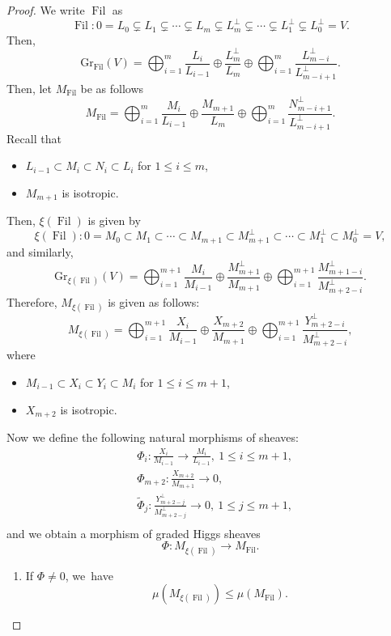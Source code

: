 \documentclass[11pt]{article}
\numberwithin{equation}{section}
\DeclareMathOperator{\Filt}{Fil}
\newcommand{\Gr}{\mathrm{Gr}}
\theoremstyle{plain}
\theoremstyle{definition}
\begin{document}
\begin{proof}
We write $\Filt$ as
\[
\Filt: 0= L_0 \subsetneq L_1 \subsetneq \cdots \subsetneq L_m \subsetneq L_m^\perp\subsetneq\cdots \subsetneq L_1^\perp\subsetneq L_0^\perp= V.
\]
Then,
\[
\Gr_{\Filt}(V)=\mathop{\bigoplus}_{i=1}^{m} \frac{L_i}{L_{i-1}}\oplus \frac{L_m^\perp}{L_m}\oplus \mathop{\bigoplus}_{i=1}^{m} \frac{L_{m-i}^\perp}{L_{m-i+1}^\perp}.
\]
Then, let $M_{\Filt}$ be as follows
\[
M_{\Filt}=\mathop{\bigoplus}_{i=1}^{m} \frac{M_i}{L_{i-1}}\oplus \frac{M_{m+1}}{L_m}\oplus \mathop{\bigoplus}_{i=1}^{m} \frac{N_{m-i+1}^\perp}{L_{m-i+1}^\perp}.
\]
Recall that
\begin{itemize}
\item $L_{i-1} \subset M_i \subset N_i \subset L_i$ for $1 \leq i \leq m$,
\item $M_{m+1}$ is isotropic.
\end{itemize}
Then, $\xi(\Filt)$ is given by
\[
\xi(\Filt):0=M_0\subset M_1\subset\cdots\subset M_{m+1}\subset M_{m+1}^\perp\subset\cdots\subset M_1^\perp\subset M_0^\perp=V,
\]
and similarly,
\[
\Gr_{\xi(\Filt)}(V)=\mathop{\bigoplus}_{i=1}^{m+1} \frac{M_i}{M_{i-1}}\oplus \frac{M_{m+1}^\perp}{M_{m+1}}\oplus \mathop{\bigoplus}_{i=1}^{m+1} \frac{M_{m+1-i}^\perp}{M_{m+2-i}^\perp}.
\]
Therefore, $M_{\xi(\Filt)}$ is given as follows:
\[
M_{\xi(\Filt)}=\mathop{\bigoplus}_{i=1}^{m+1} \frac{X_i}{M_{i-1}}\oplus \frac{X_{m+2}}{M_{m+1}}\oplus \mathop{\bigoplus}_{i=1}^{m+1} \frac{Y_{m+2-i}^\perp}{M_{m+2-i}^\perp},
\]
where
\begin{itemize}
\item $M_{i-1} \subset X_i \subset Y_i \subset M_i$ for $1 \leq i \leq m+1$,
\item $X_{m+2}$ is isotropic.
\end{itemize}

Now we define the following natural morphisms of sheaves:
\begin{equation}
\begin{split}
&\Phi_i:\frac{X_i}{M_{i-1}}\to \frac{M_i}{L_{i-1}},\ 1\leq i\leq m+1,\\
&\Phi_{m+2}:\frac{X_{m+2}}{M_{m+1}}\to 0,\\&\tilde{\Phi}_j:\frac{Y_{m+2-j}^\perp}{M_{m+2-j}^\perp}\to 0,\ 1\leq j\leq m+1,\\
\end{split}
\end{equation}
and we obtain a morphism of graded Higgs sheaves
\[
\Phi: M_{\xi(\Filt)}\to M_{\Filt}.
\]
\begin{enumerate}
\item If $\Phi\neq 0$, we~have
\[
\mu(M_{\xi(\Filt)})\leq \mu(M_{\Filt}).
\]


\end{enumerate}
\end{proof}
\end{document}
